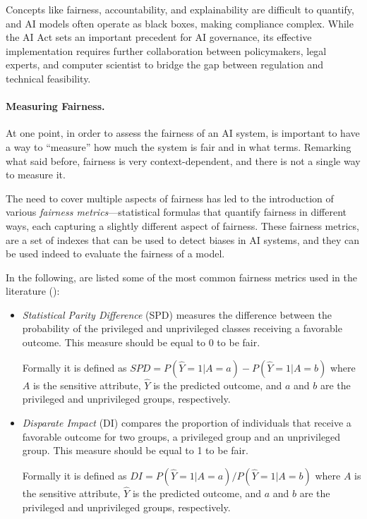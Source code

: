 \documentclass[12pt,a4paper,openright,twoside]{book}
\begin{document}
Concepts like fairness, accountability, and explainability are difficult to quantify, and AI models often operate as black boxes, making compliance complex.
%
While the AI Act sets an important precedent for AI governance, its effective implementation requires further collaboration between policymakers, legal experts, and computer scientist to bridge the gap between regulation and technical feasibility.


\paragraph{Measuring Fairness.}

At one point, in order to assess the fairness of an \ac{AI} system, is important to have a way to ``measure'' how much the system is fair and in what terms.
%
Remarking what said before, fairness is very context-dependent, and there is not a single way to measure it. 


The need to cover multiple aspects of fairness has led to the introduction of various \textit{fairness metrics}---statistical formulas that quantify fairness in different ways, each capturing a slightly different aspect of fairness.
%
These fairness metrics, are a set of indexes that can be used to detect biases in \ac{AI} systems, and they can be used indeed to evaluate the fairness of a model.
%


In the following, are listed some of the most common fairness metrics used in the literature (\cite{DBLP:conf/bias/IrfanML23}):

\begin{itemize}
    \item \textit{Statistical Parity Difference} (SPD) measures the difference between the probability of the privileged and unprivileged classes receiving a favorable outcome. This measure should be equal to 0 to be fair.
    
    Formally it is defined as $SPD = P(\hat{Y} = 1 | A = a) - P(\hat{Y} = 1 | A = b)$
    where $A$ is the sensitive attribute, $\hat{Y}$ is the predicted outcome, and $a$ and $b$ are the privileged and unprivileged groups, respectively.
    
    \item \textit{Disparate Impact} (DI) compares the proportion of individuals that receive a favorable outcome for two groups, a privileged group and an unprivileged group. This measure should be equal to 1 to be fair.
    
    Formally it is defined as $DI = P(\hat{Y} = 1 | A = a) / P(\hat{Y} = 1 | A = b)$
    where $A$ is the sensitive attribute, $\hat{Y}$ is the predicted outcome, and $a$ and $b$ are the privileged and unprivileged groups, respectively.
    
\end{itemize}
\end{document}

